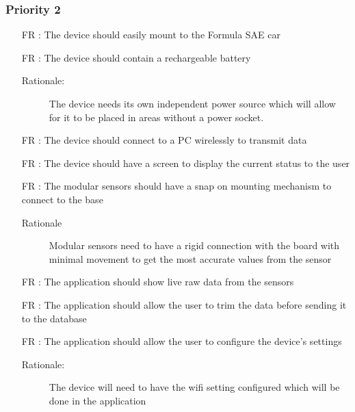 \documentclass[12pt]{article}
\newcounter{reqnum} %
\begin{document}
\subsubsection{Priority 2}
\begin{itemize}

  \item[FR \refstepcounter{reqnum}\thereqnum:] The device should easily mount to the Formula SAE car

  \item[FR \refstepcounter{reqnum}\thereqnum:] The device should contain a rechargeable battery
  \begin{description} \item[Rationale:] The device needs its own independent power source which will allow for it to be placed in areas without a power socket. \end{description}

  \item[FR \refstepcounter{reqnum}\thereqnum:] The device should connect to a PC wirelessly to transmit data

  \item[FR \refstepcounter{reqnum}\thereqnum:] The device should have a screen to display the current status to the user
  
  \item[FR \refstepcounter{reqnum}\thereqnum:] The modular sensors should have a snap on mounting mechanism to connect to the base
  \begin{description} \item[Rationale] Modular sensors need to have a rigid connection with the board with minimal movement to get the most accurate values from the sensor  \end{description}

  \item[FR \refstepcounter{reqnum}\thereqnum:] The application should show live raw data from the sensors
  
  \item[FR \refstepcounter{reqnum}\thereqnum:] The application should allow the user to trim the data before sending it to the database
  
  \item[FR \refstepcounter{reqnum}\thereqnum:] The application should allow the user to configure the device's settings
  \begin{description} \item[Rationale:] The device will need to have the wifi setting configured which will be done in the application \end{description}
  
  \end{itemize}
\end{document}
